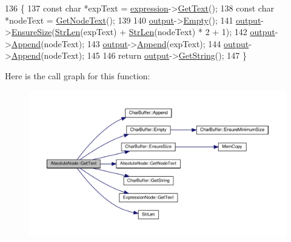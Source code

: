 \begin{DoxyCode}
136 \{
137     \textcolor{keyword}{const} \textcolor{keywordtype}{char} *expText = \hyperlink{classAbsoluteNode_a1b1bea1b153597964e64c7e15f0aa9e1}{expression}->\hyperlink{classExpressionNode_a0bbf243108a14eaf963a8161ffd8eb92}{GetText}();
138     \textcolor{keyword}{const} \textcolor{keywordtype}{char} *nodeText = \hyperlink{classAbsoluteNode_ae5e2148cb9fedaee9137d3c124399c76}{GetNodeText}();
139 
140     \hyperlink{classSyntaxNode_a1180628cbe3fce43930cee0df5a9ce5c}{output}->\hyperlink{classCharBuffer_abe39d3fd7d8b9c8ec343af2cae7adc96}{Empty}();
141     \hyperlink{classSyntaxNode_a1180628cbe3fce43930cee0df5a9ce5c}{output}->\hyperlink{classCharBuffer_ad1907009b5ad136692b989fa96bf2f7e}{EnsureSize}(\hyperlink{clib_8h_a67ec56eb98b49515d35005a5b3bf9a32}{StrLen}(expText) + \hyperlink{clib_8h_a67ec56eb98b49515d35005a5b3bf9a32}{StrLen}(nodeText) * 2 + 1);
142     \hyperlink{classSyntaxNode_a1180628cbe3fce43930cee0df5a9ce5c}{output}->\hyperlink{classCharBuffer_a045b38735f7b3007c1b98d3d7b7feafe}{Append}(nodeText);
143     \hyperlink{classSyntaxNode_a1180628cbe3fce43930cee0df5a9ce5c}{output}->\hyperlink{classCharBuffer_a045b38735f7b3007c1b98d3d7b7feafe}{Append}(expText);
144     \hyperlink{classSyntaxNode_a1180628cbe3fce43930cee0df5a9ce5c}{output}->\hyperlink{classCharBuffer_a045b38735f7b3007c1b98d3d7b7feafe}{Append}(nodeText);
145 
146     \textcolor{keywordflow}{return} \hyperlink{classSyntaxNode_a1180628cbe3fce43930cee0df5a9ce5c}{output}->\hyperlink{classCharBuffer_a7dfd3feaaf80f318ba44efe15b1ec44b}{GetString}();
147 \}
\end{DoxyCode}


Here is the call graph for this function\+:\nopagebreak
\begin{figure}[H]
\begin{center}
\leavevmode
\includegraphics[width=350pt]{classAbsoluteNode_ada1094b5e5ed6033f193ac151058c364_cgraph}
\end{center}
\end{figure}


